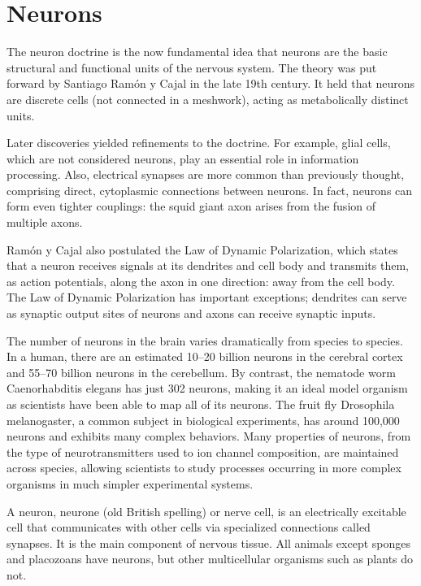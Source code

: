 \documentclass[]{book}
\begin{document}
\hypertarget{neurons}{%
\section{Neurons}\label{neurons}}

The neuron doctrine is the now fundamental idea that neurons are the basic structural and functional units of the nervous system. The theory was put forward by Santiago Ramón y Cajal in the late 19th century. It held that neurons are discrete cells (not connected in a meshwork), acting as metabolically distinct units.

Later discoveries yielded refinements to the doctrine. For example, glial cells, which are not considered neurons, play an essential role in information processing. Also, electrical synapses are more common than previously thought, comprising direct, cytoplasmic connections between neurons. In fact, neurons can form even tighter couplings: the squid giant axon arises from the fusion of multiple axons.

Ramón y Cajal also postulated the Law of Dynamic Polarization, which states that a neuron receives signals at its dendrites and cell body and transmits them, as action potentials, along the axon in one direction: away from the cell body. The Law of Dynamic Polarization has important exceptions; dendrites can serve as synaptic output sites of neurons and axons can receive synaptic inputs.

The number of neurons in the brain varies dramatically from species to species. In a human, there are an estimated 10--20 billion neurons in the cerebral cortex and 55--70 billion neurons in the cerebellum. By contrast, the nematode worm Caenorhabditis elegans has just 302 neurons, making it an ideal model organism as scientists have been able to map all of its neurons. The fruit fly Drosophila melanogaster, a common subject in biological experiments, has around 100,000 neurons and exhibits many complex behaviors. Many properties of neurons, from the type of neurotransmitters used to ion channel composition, are maintained across species, allowing scientists to study processes occurring in more complex organisms in much simpler experimental systems.

A neuron, neurone (old British spelling) or nerve cell, is an electrically excitable cell that communicates with other cells via specialized connections called synapses. It is the main component of nervous tissue. All animals except sponges and placozoans have neurons, but other multicellular organisms such as plants do not.
\end{document}
